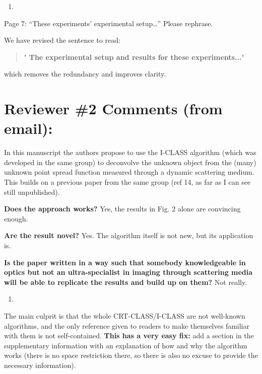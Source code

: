 \documentclass[12pt]{article}
\newenvironment{solved_reviewercomment}
    {\begin{tcolorbox}[width=\linewidth,colback=gray!5,colframe=solved_commentcolor!50,title=Reviewer Comment,left=5pt,right=5pt]}
    {\end{tcolorbox}}
\newenvironment{finished_ourresponse}
    {\begin{tcolorbox}[width=\linewidth,breakable,enhanced,colback=gray!5,colframe=finished_responsecolor!50,title=Response,left=5pt,right=5pt]}
    {\end{tcolorbox}}
\begin{document}
\begin{enumerate}[label=\arabic*., resume]
\item \leavevmode
\end{enumerate}
\vspace{-1em}
\begin{solved_reviewercomment}
    Page 7: “These experiments’ experimental setup…” Please rephrase.
\end{solved_reviewercomment}

\begin{finished_ourresponse}
    
    We have revised the sentence to read: 
    \begin{quote}
        "{\bfseries
        The experimental setup and results for these experiments...}" 
    \end{quote}
    which removes the redundancy and improves clarity.
\end{finished_ourresponse}


\newpage
\setcounter{section}{1}
\section{Reviewer \#2 Comments (from email):}

In this manuscript the authors propose to use the I-CLASS algorithm (which was developed in the same group) to deconvolve the unknown object from the (many) unknown point spread function measured through a dynamic scattering medium. This builds on a previous paper from the same group (ref 14, as far as I can see still unpublished).

\textbf{Does the approach works?} Yes, the results in Fig. 2 alone are convincing enough.

\textbf{Are the result novel?} Yes. The algorithm itself is not new, but its application is.

\textbf{Is the paper written in a way such that somebody knowledgeable in optics but not an ultra-specialist in imaging through scattering media will be able to replicate the results and build up on them?} Not really. 

\begin{enumerate}[label=\arabic*.]
\item \leavevmode
\end{enumerate}
\vspace{-1em}
\begin{solved_reviewercomment}
    The main culprit is that the whole CRT-CLASS/I-CLASS are not well-known algorithms, and the only reference given to readers to make themselves familiar with them is not self-contained. \textbf{This has a very easy fix:} add a section in the supplementary information with an explanation of how and why the algorithm works (there is no space restriction there, so there is also no excuse to provide the necessary information).
\end{solved_reviewercomment}
\end{document}
